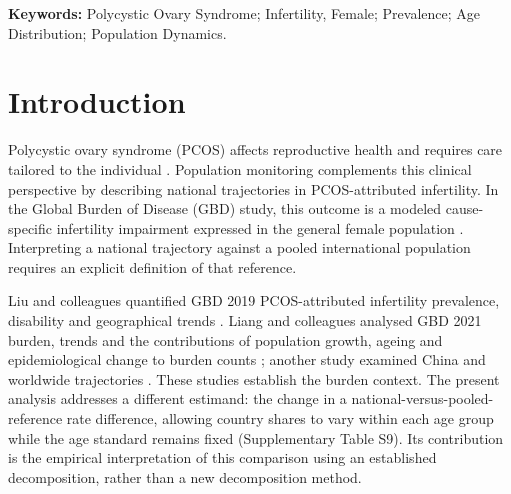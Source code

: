 \documentclass[11pt,a4paper]{article}
\begin{document}
\begin{abstract}
\noindent\textbf{LIMITATIONS, REASONS FOR CAUTION:} Joint posterior uncertainty in component magnitudes and near-zero differences remains unquantified. The 58.5\% value is a signed accounting ratio, not a causal or case-attributable fraction. The selected G20 comparison does not represent the world or a clinically matched population.

\noindent\textbf{WIDER IMPLICATIONS OF THE FINDINGS:} International reproductive-health comparisons should specify the reference population and report absolute rate and composition components alongside net differences. Contemporary and fixed-composition benchmarks answer complementary monitoring questions; a narrowing difference alone does not indicate a reduction in infertility burden.

\noindent\textbf{FUNDING:} XX: verified funding sources and funder roles to be completed by the authors at submission.

\noindent\textbf{DISCLOSURES:} XX: author-specific disclosures to be completed at submission.

\noindent\textbf{TRIAL REGISTRATION NUMBER:} Not applicable; this is a secondary analysis of aggregate estimates, not a clinical trial.
\end{abstract}
\endgroup

\textbf{Keywords:} Polycystic Ovary Syndrome; Infertility, Female; Prevalence; Age Distribution; Population Dynamics.

\section{Introduction}
Polycystic ovary syndrome (PCOS) affects reproductive health and requires care tailored to the individual \citep{pcos}. Population monitoring complements this clinical perspective by describing national trajectories in PCOS-attributed infertility. In the Global Burden of Disease (GBD) study, this outcome is a modeled cause-specific infertility impairment expressed in the general female population \citep{gbd}. Interpreting a national trajectory against a pooled international population requires an explicit definition of that reference.

Liu and colleagues quantified GBD 2019 PCOS-attributed infertility prevalence, disability and geographical trends \citep{liu_pcos2024}. Liang and colleagues analysed GBD 2021 burden, trends and the contributions of population growth, ageing and epidemiological change to burden counts \citep{liang_burden2025}; another study examined China and worldwide trajectories \citep{liang_trend2026}. These studies establish the burden context. The present analysis addresses a different estimand: the change in a national-versus-pooled-reference rate difference, allowing country shares to vary within each age group while the age standard remains fixed (Supplementary Table S9). Its contribution is the empirical interpretation of this comparison using an established decomposition, rather than a new decomposition method.
\end{document}
